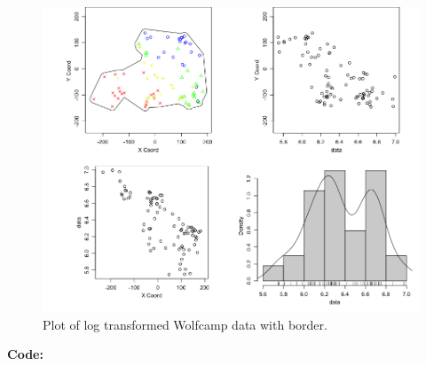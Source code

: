 \documentclass[12pt]{article}
\makeatletter
\theoremstyle{homework}
\newenvironment{exercise}[1]
{\def\@currentlabel{#1}\exercisecore}
{\endexercisecore}
\makeatother
\begin{document}
\begin{exercise}{1}
    \begin{figure}[H]
      \begin{center}
        \caption{Plot of log transformed Wolfcamp data with border.}
      \includegraphics[width = \textwidth]{Rplot01.png}
      \end{center}
    \end{figure}
      \textbf{Code:}
      \begin{center}
      
      \end{center}
\end{exercise}
\vspace{1in}
\end{document}
